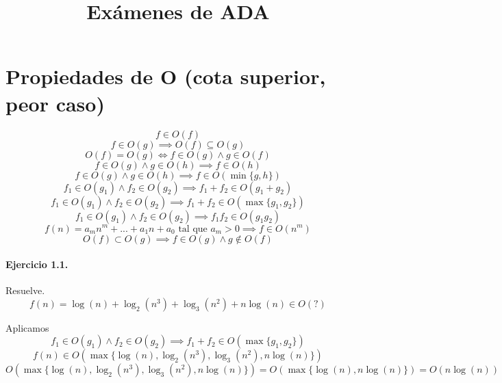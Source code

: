 \documentclass{article}
\title{Exámenes de ADA}
\begin{document}
	\section{Propiedades de O (cota superior, peor caso)}
	{\LARGE
	\begin{equation}
		f \in O(f)
	\end{equation}
	\begin{equation}
		f \in O(g) \implies O(f) \subseteq O(g)
	\end{equation}
	\begin{equation}
		O(f) = O(g) \iff f \in O(g) \land g \in O(f)
	\end{equation}
	\begin{equation}
		f \in O(g) \land g \in O(h) \implies f \in O(h) 
	\end{equation}
	\begin{equation}
		f \in O(g) \land g \in O(h) \implies f \in O(\min \{g, h\})
	\end{equation}
	\begin{equation}
		f_1 \in O(g_1) \land f_2 \in O(g_2) \implies f_1 + f_2 \in O(g_1 + g_2) 
	\end{equation}
	\begin{equation}
		f_1 \in O(g_1) \land f_2 \in O(g_2) \implies f_1 + f_2 \in O(\max \{g_1, g_2\})
	\end{equation}
	\begin{equation}
		f_1 \in O(g_1) \land f_2 \in O(g_2) \implies f_1 f_2 \in O(g_1 g_2)
	\end{equation}	
	\begin{equation}
		f(n) = a_m n^m + ... + a_1 n + a_0 \text{ tal que } a_m > 0 \implies f \in O(n^m)
	\end{equation}	
	\begin{equation}
		O(f) \subset O(g) \implies f \in O(g) \land g \notin O(f)
	\end{equation}	
	}
	
	\paragraph{Ejercicio 1.1.} Resuelve.
	{\LARGE
	\begin{displaymath}
		f(n)=\log (n) + \log_2 (n^3) + \log_3 (n^2) + n \log(n) \in O(?)
	\end{displaymath}
	}
	
	Aplicamos
	\begin{displaymath}
		f_1 \in O(g_1) \land f_2 \in O(g_2) \implies f_1 + f_2 \in O(\max \{g_1, g_2\})
	\end{displaymath}
	\begin{displaymath}
		f(n) \in O(\max \{\log(n), \log_2(n^3), \log_3(n^2), n\log(n)\})
	\end{displaymath}
	\begin{displaymath}
		O(\max \{\log(n), \log_2(n^3), \log_3(n^2), n\log(n)\}) = O(\max \{\log(n), n \log(n)\}) = O(n \log(n))
	\end{displaymath}
	
\end{document}
